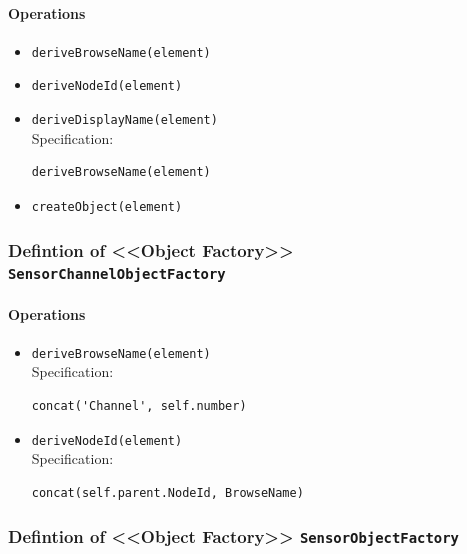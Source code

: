 \paragraph{Operations}
\begin{itemize}
  \item \texttt{deriveBrowseName(element)}
  \item \texttt{deriveNodeId(element)}
  \item \texttt{deriveDisplayName(element)}\\
    Specification:
   \indent \begin{Verbatim}[xleftmargin=.25in,fontsize=\small]
deriveBrowseName(element)
\end{Verbatim}

  \item \texttt{createObject(element)}
\end{itemize}
\subsubsection{Defintion of <<Object Factory>> \texttt{SensorChannelObjectFactory}} \label{type:SensorChannelObjectFactory}

\FloatBarrier



\paragraph{Operations}
\begin{itemize}
  \item \texttt{deriveBrowseName(element)}\\
    Specification:
   \indent \begin{Verbatim}[xleftmargin=.25in,fontsize=\small]
concat('Channel', self.number)
\end{Verbatim}

  \item \texttt{deriveNodeId(element)}\\
    Specification:
   \indent \begin{Verbatim}[xleftmargin=.25in,fontsize=\small]
concat(self.parent.NodeId, BrowseName)
\end{Verbatim}

\end{itemize}
\subsubsection{Defintion of <<Object Factory>> \texttt{SensorObjectFactory}} \label{type:SensorObjectFactory}


